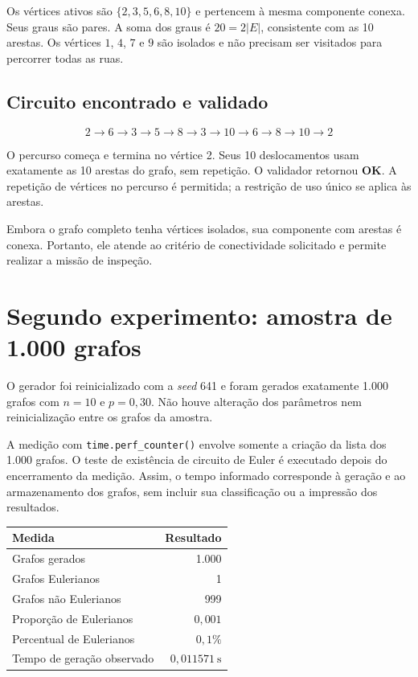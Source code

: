 \documentclass[11pt,a4paper]{article}
\newcommand{\funcao}[1]{\texttt{#1}}
\begin{document}
Os vértices ativos são $\{2,3,5,6,8,10\}$ e pertencem à mesma componente
conexa. Seus graus são pares. A soma dos graus é $20=2|E|$, consistente
com as 10 arestas. Os vértices $1$, $4$, $7$ e $9$ são isolados e não
precisam ser visitados para percorrer todas as ruas.

\subsection{Circuito encontrado e validado}

\[
\boxed{2\to6\to3\to5\to8\to3\to10\to6\to8\to10\to2}
\]

O percurso começa e termina no vértice 2. Seus 10 deslocamentos usam
exatamente as 10 arestas do grafo, sem repetição. O validador retornou
\textbf{OK}. A repetição de vértices no percurso é permitida; a restrição
de uso único se aplica às arestas.

Embora o grafo completo tenha vértices isolados, sua componente com arestas
é conexa. Portanto, ele atende ao critério de conectividade solicitado e
permite realizar a missão de inspeção.

\newpage
\section{Segundo experimento: amostra de 1.000 grafos}

O gerador foi reinicializado com a \textit{seed} 641 e foram gerados
exatamente 1.000 grafos com $n=10$ e $p=0{,}30$. Não houve alteração dos
parâmetros nem reinicialização entre os grafos da amostra.

A medição com \funcao{time.perf\_counter()} envolve somente a criação
da lista dos 1.000 grafos. O teste de existência de circuito de Euler
é executado depois do encerramento da medição. Assim, o tempo informado
corresponde à geração e ao armazenamento dos grafos, sem incluir sua
classificação ou a impressão dos resultados.

\begin{center}
\begin{tabular}{lr}
\toprule
Medida & Resultado \\
\midrule
Grafos gerados & 1.000 \\
Grafos Eulerianos & 1 \\
Grafos não Eulerianos & 999 \\
Proporção de Eulerianos & $0{,}001$ \\
Percentual de Eulerianos & $0{,}1\%$ \\
Tempo de geração observado & $0{,}011571\ \mathrm{s}$ \\
\bottomrule
\end{tabular}
\end{center}
\end{document}
